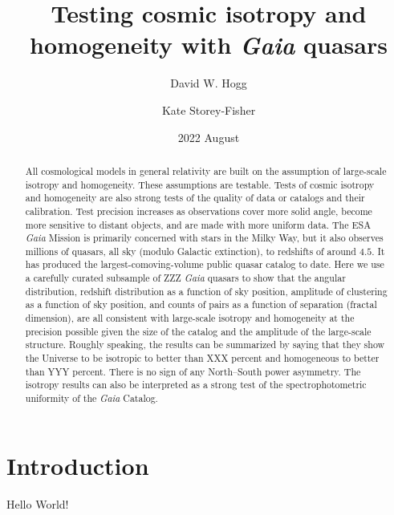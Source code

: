 \documentclass[modern]{aastex631}
\begin{document}
\title{%
Testing cosmic isotropy and homogeneity
with \textsl{Gaia} quasars}
\author{David W. Hogg}

\author{Kate Storey-Fisher}

\date{2022 August}

\begin{abstract}\noindent
All cosmological models in general relativity are built on the assumption of large-scale isotropy and homogeneity.
These assumptions are testable.
Tests of cosmic isotropy and homogeneity are also strong tests of the quality of data or catalogs and their calibration.
Test precision increases as observations cover more solid angle, become more sensitive to distant objects, and are made with more uniform data.
The ESA \textsl{Gaia} Mission is primarily concerned with stars in the Milky Way, but it also observes millions of quasars, all sky (modulo Galactic extinction), to redshifts of around $4.5$.
It has produced the largest-comoving-volume public quasar catalog to date.
Here we use a carefully curated subsample of ZZZ \textsl{Gaia} quasars to show that the angular distribution, redshift distribution as a function of sky position, amplitude of clustering as a function of sky position, and counts of pairs as a function of separation (fractal dimension), are all consistent with large-scale isotropy and homogeneity at the precision possible given the size of the catalog and the amplitude of the large-scale structure.
Roughly speaking, the results can be summarized by saying that they show the Universe to be isotropic to better than XXX percent and homogeneous to better than YYY percent.
There is no sign of any North--South power asymmetry.
The isotropy results can also be interpreted as a strong test of the spectrophotometric uniformity of the \textsl{Gaia} Catalog.
\end{abstract}


\section{Introduction}

Hello World!
\end{document}
